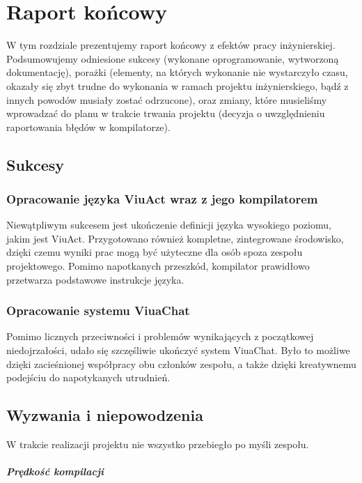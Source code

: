 \chapter{Raport końcowy}
\label{raport_koncowy}

W tym rozdziale prezentujemy raport końcowy z efektów pracy inżynierskiej.
Podsumowujemy odniesione sukcesy (wykonane oprogramowanie, wytworzoną dokumentację), porażki (elementy, na
których wykonanie nie wystarczyło czasu, okazały się zbyt trudne do wykonania w ramach projektu
inżynierskiego, bądź z innych powodów musiały zostać odrzucone), oraz zmiany, które musieliśmy wprowadzać do
planu w trakcie trwania projektu (decyzja o uwzględnieniu raportowania błędów w kompilatorze).

\section{Sukcesy}

\subsection{Opracowanie języka ViuAct wraz z jego kompilatorem}
Niewątpliwym sukcesem jest ukończenie definicji języka wysokiego poziomu,
jakim jest ViuAct. Przygotowano również kompletne, zintegrowane środowisko,
dzięki czemu wyniki prac mogą być użyteczne dla osób spoza zespołu projektowego.
Pomimo napotkanych przeszkód, kompilator prawidłowo przetwarza podstawowe
instrukcje języka.

\subsection{Opracowanie systemu ViuaChat}
Pomimo licznych przeciwności i problemów wynikających z początkowej niedojrzałości, udało się szczęśliwie ukończyć system ViuaChat. Było to
możliwe dzięki zacieśnionej współpracy obu członków zespołu, a także dzięki
kreatywnemu podejściu do napotykanych utrudnień.

\section{Wyzwania i niepowodzenia}

W trakcie realizacji projektu nie wszystko przebiegło po myśli zespołu.

\paragraph*{Prędkość kompilacji}

